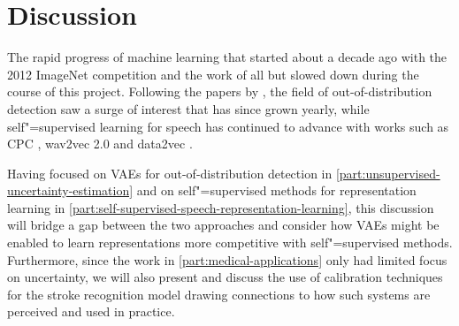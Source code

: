 
\chapter[discussion]{Discussion}\label{chp:discussion}
%

The rapid progress of machine learning that started about a decade ago with the 2012 ImageNet competition and the work of \textcite{krizhevsky_imagenet_2012} all but slowed down during the course of this project. 
Following the papers by \textcite{choi_waic_2019,nalisnick_detecting_2019,hendrycks_deep_2019}, the field of out-of-distribution detection saw a surge of interest that has since grown yearly, while self"=supervised learning for speech has continued to advance with works such as CPC \parencite{oord_representation_2018}, wav2vec 2.0 \parencite{baevski_wav2vec_2020} and data2vec \parencite{baevski_data2vec_2022}. 

Having focused on VAEs for out-of-distribution detection in \cref{part:unsupervised-uncertainty-estimation} and on self"=supervised methods for representation learning in \cref{part:self-supervised-speech-representation-learning}, this discussion will bridge a gap between the two approaches and consider how VAEs might be enabled to learn representations more competitive with self"=supervised methods. 
Furthermore, since the work in \cref{part:medical-applications} only had limited focus on uncertainty, we will also present and discuss the use of calibration techniques for the stroke recognition model drawing connections to how such systems are perceived and used in practice. 


